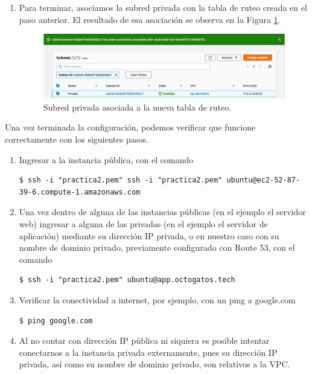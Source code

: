 \documentclass{article}
\begin{document}
\begin{enumerate}
  \item Para terminar, asociamos la subred privada con
    la tabla de ruteo creada en el paso anterior. El
    resultado de esa asociaci\'on se observa en la Figura
    \ref{fig:subnetRouteTable}.
    \begin{figure}[H]
      \centering
      \includegraphics[width=\textwidth]{NAT/subnetRouteTable}
      \caption{Subred privada asociada a la nueva tabla
      de ruteo.}
      \label{fig:subnetRouteTable}
    \end{figure}
\end{enumerate}

Una vez terminada la configuraci\'on, podemos verificar
que funcione correctamente con los siguientes pasos.

\begin{enumerate}
  \item Ingresar a la instancia p\'ublica, con el
    comando
\begin{lstlisting}
$ ssh -i "practica2.pem" ssh -i "practica2.pem" ubuntu@ec2-52-87-39-6.compute-1.amazonaws.com
\end{lstlisting}

  \item Una vez dentro de alguna de las instancias p\'ublicas
    (en el ejemplo el servidor web) ingresar a alguna de las
    privadas (en el ejemplo el servidor de aplicaci\'on)
    mediante su direcci\'on IP privada, o en
    nuestro caso con su nombre de dominio privado,
    previamente configurado con Route 53, con el comando
\begin{lstlisting}
$ ssh -i "practica2.pem" ubuntu@app.octogatos.tech
\end{lstlisting}

  \item Verificar la conectividad a internet, por
    ejemplo, con un ping a google.com
\begin{lstlisting}
$ ping google.com
\end{lstlisting}

  \item Al no contar con direcci\'on IP p\'ublica
    ni siquiera es posible intentar conectarnos a
    la instancia privada externamente, pues su
    direcci\'on IP privada, as\'i como su nombre
    de dominio privado, son relativos a la VPC.
\end{enumerate}
\end{document}

